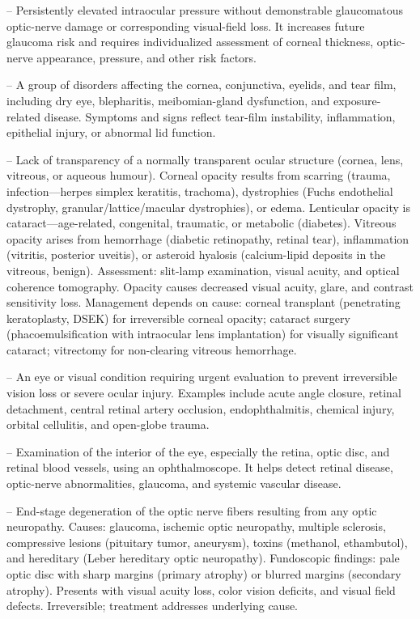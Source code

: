 -- Persistently elevated intraocular pressure without demonstrable glaucomatous optic-nerve damage or corresponding visual-field loss. It increases future glaucoma risk and requires individualized assessment of corneal thickness, optic-nerve appearance, pressure, and other risk factors.

-- A group of disorders affecting the cornea, conjunctiva, eyelids, and tear film, including dry eye, blepharitis, meibomian-gland dysfunction, and exposure-related disease. Symptoms and signs reflect tear-film instability, inflammation, epithelial injury, or abnormal lid function.

-- Lack of transparency of a normally transparent ocular structure (cornea, lens, vitreous, or aqueous humour). Corneal opacity results from scarring (trauma, infection—herpes simplex keratitis, trachoma), dystrophies (Fuchs endothelial dystrophy, granular/lattice/macular dystrophies), or edema. Lenticular opacity is cataract—age-related, congenital, traumatic, or metabolic (diabetes). Vitreous opacity arises from hemorrhage (diabetic retinopathy, retinal tear), inflammation (vitritis, posterior uveitis), or asteroid hyalosis (calcium-lipid deposits in the vitreous, benign). Assessment: slit-lamp examination, visual acuity, and optical coherence tomography. Opacity causes decreased visual acuity, glare, and contrast sensitivity loss. Management depends on cause: corneal transplant (penetrating keratoplasty, DSEK) for irreversible corneal opacity; cataract surgery (phacoemulsification with intraocular lens implantation) for visually significant cataract; vitrectomy for non-clearing vitreous hemorrhage.

-- An eye or visual condition requiring urgent evaluation to prevent irreversible vision loss or severe ocular injury. Examples include acute angle closure, retinal detachment, central retinal artery occlusion, endophthalmitis, chemical injury, orbital cellulitis, and open-globe trauma.

-- Examination of the interior of the eye, especially the retina, optic disc, and retinal blood vessels, using an ophthalmoscope. It helps detect retinal disease, optic-nerve abnormalities, glaucoma, and systemic vascular disease.

-- End-stage degeneration of the optic nerve fibers resulting from any optic neuropathy. Causes: glaucoma, ischemic optic neuropathy, multiple sclerosis, compressive lesions (pituitary tumor, aneurysm), toxins (methanol, ethambutol), and hereditary (Leber hereditary optic neuropathy). Fundoscopic findings: pale optic disc with sharp margins (primary atrophy) or blurred margins (secondary atrophy). Presents with visual acuity loss, color vision deficits, and visual field defects. Irreversible; treatment addresses underlying cause.

